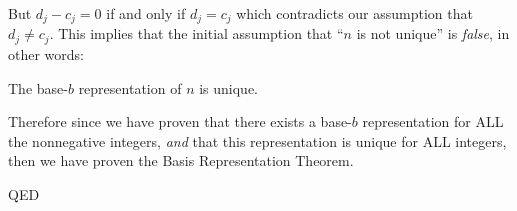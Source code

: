 \documentclass{article}
\begin{document}
But $d_j-c_j = 0$ if and only if $d_j = c_j$
which contradicts our assumption that $d_j\ne{}c_j$. This implies that the initial assumption that ``$n$
is not unique'' is \emph{false}, in other words:
\begin{center}
The base-$b$ representation of $n$ is unique.
\end{center}

\bigskip
Therefore since we have proven that there exists a base-$b$ representation for ALL the nonnegative integers, \emph{and}
that this representation is unique for ALL integers, then we have proven the Basis Representation Theorem.

QED
\end{document}
